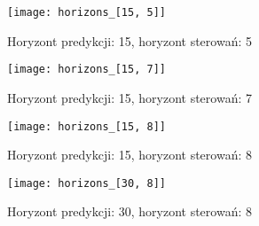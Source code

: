 \begin{figure}[p]
    \centering
	\texttt{[image: horizons\_[15, 5]]}
	\caption{Horyzont predykcji: 15, horyzont sterowań: 5}
	\label{fig:horizons_15_5}
\end{figure}

\begin{figure}[p]
    \centering
	\texttt{[image: horizons\_[15, 7]]}
	\caption{Horyzont predykcji: 15, horyzont sterowań: 7}
	\label{fig:horizons_15_7}
\end{figure}

\begin{figure}[p]
    \centering
	\texttt{[image: horizons\_[15, 8]]}
	\caption{Horyzont predykcji: 15, horyzont sterowań: 8}
	\label{fig:horizons_15_8}
\end{figure}

\begin{figure}[p]
    \centering
	\texttt{[image: horizons\_[30, 8]]}
	\caption{Horyzont predykcji: 30, horyzont sterowań: 8}
	\label{fig:horizons_30_8}
\end{figure}